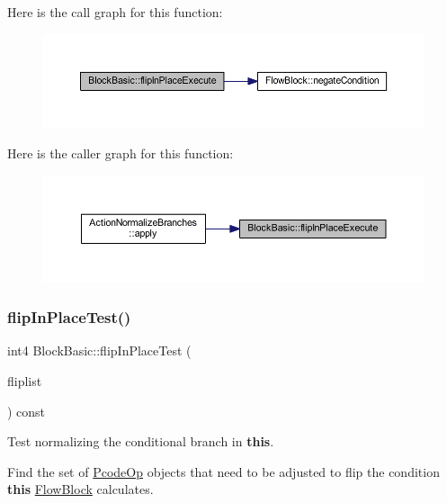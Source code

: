 Here is the call graph for this function\+:
\nopagebreak
\begin{figure}[H]
\begin{center}
\leavevmode
\includegraphics[width=350pt]{class_block_basic_a2949ef4a8d42f16c696fd24ba2ecb58c_cgraph}
\end{center}
\end{figure}
Here is the caller graph for this function\+:
\nopagebreak
\begin{figure}[H]
\begin{center}
\leavevmode
\includegraphics[width=350pt]{class_block_basic_a2949ef4a8d42f16c696fd24ba2ecb58c_icgraph}
\end{center}
\end{figure}
\mbox{\label{class_block_basic_a7f864c14ab60a19ffb492b86f98f29c7}} 
\subsubsection{\texorpdfstring{flipInPlaceTest()}{flipInPlaceTest()}}
{\footnotesize\ttfamily int4 Block\+Basic\+::flip\+In\+Place\+Test (\begin{DoxyParamCaption}\item[{vector$<$ \mbox{\hyperlink{class_pcode_op}{Pcode\+Op}} $\ast$ $>$ \&}]{fliplist }\end{DoxyParamCaption}) const\hspace{0.3cm}{\ttfamily [virtual]}}



Test normalizing the conditional branch in {\bfseries{this}}. 

Find the set of \mbox{\hyperlink{class_pcode_op}{Pcode\+Op}} objects that need to be adjusted to flip the condition {\bfseries{this}} \mbox{\hyperlink{class_flow_block}{Flow\+Block}} calculates.

